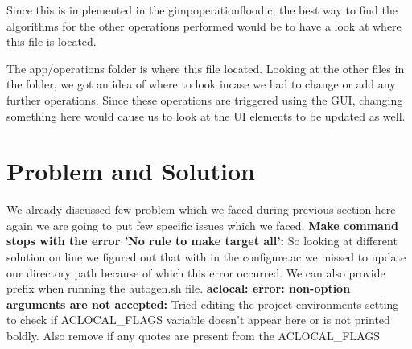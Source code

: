 Since this is implemented in the gimpoperationflood.c, the best way to find the algorithms for the other operations performed would be to have a look at where this file is located.
 
The app/operations folder is where this file located. Looking at the other files in the folder, we got an idea of where to look incase we had to change or add any further operations. Since these operations are triggered using the GUI, changing something here would cause us to look at the UI elements to be updated as well.

\section{Problem and Solution}
We already discussed few problem which we faced during previous section here again we are going to put few specific issues which we faced.
\newline
\textbf{Make command stops with the error 'No rule to make target all':} So looking at different solution on line we figured out that with in the configure.ac we missed to update our directory path because of which this error occurred. We can also provide prefix when running the autogen.sh file.
\newline
\textbf{aclocal: error: non-option arguments are not accepted:} Tried editing the project environments setting to check if  ACLOCAL\_FLAGS variable doesn't appear here or is not printed boldly. Also remove if any quotes are present from the  ACLOCAL\_FLAGS
